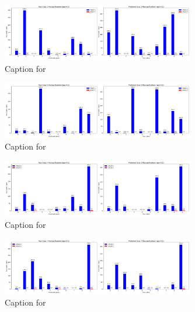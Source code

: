 \documentclass{article}
\begin{document}
\begin{figure}[!htbp]
\centering
\includegraphics[width=0.75\textwidth]{combined_class_boundary_pgd/combined_class_2_misclassifications_eps_0.1.png}
\caption{Caption for }
\label{fig:combined_class_2_misclassifications_eps_0.1.png}
\end{figure}

\begin{figure}[!htbp]
\centering
\includegraphics[width=0.75\textwidth]{combined_class_boundary_pgd/combined_class_5_misclassifications_eps_0.1.png}
\caption{Caption for }
\label{fig:combined_class_5_misclassifications_eps_0.1.png}
\end{figure}

\begin{figure}[!htbp]
\centering
\includegraphics[width=0.75\textwidth]{combined_class_boundary_pgd/combined_class_4_misclassifications_eps_0.1.png}
\caption{Caption for }
\label{fig:combined_class_4_misclassifications_eps_0.1.png}
\end{figure}

\begin{figure}[!htbp]
\centering
\includegraphics[width=0.75\textwidth]{combined_class_boundary_pgd/combined_class_7_misclassifications_eps_0.1.png}
\caption{Caption for }
\label{fig:combined_class_7_misclassifications_eps_0.1.png}
\end{figure}
\end{document}
